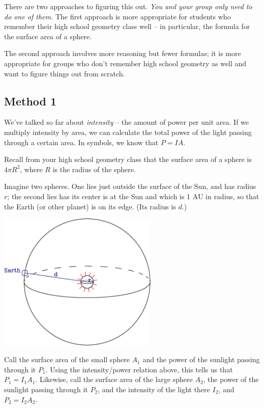 \documentclass[11pt]{article}
\begin{document}
There are two approaches to figuring this out. {\it You and your group only need to do one of them.} The first approach is more appropriate for students who remember their high school geometry class well -- in particular, the formula for the surface area of a sphere.

The second approach involves more reasoning but fewer formulas; it is more appropriate for groups who don't remember high school geometry as well and want to figure things out from scratch.
\newpage

\subsection*{Method 1}

We've talked so far about {\it intensity} -- the amount of power per unit area. If we multiply intensity by area, we can 
calculate the total power of the light passing through a certain area. In symbols, we know that $P=IA$.

Recall from your high school geometry class that the surface area of a sphere is $4\pi R^2$, where $R$ is the radius of 
the sphere.

Imagine two spheres. One lies just outside the surface of the Sun, and has radius $r$; the second lies
has its center is at the Sun and which is 1 AU in radius, so that the Earth (or other planet) 
is on its edge. (Its radius is $d$.) 

\begin{center}
\includegraphics[width=3in]{expand-crop.pdf}
\end{center}

Call the surface area of the small sphere $A_1$ and the power of the sunlight passing through it $P_1$. Using the intensity/power 
relation above, this tells us that $P_1=I_1 A_1$. Likewise, call the surface area of the large sphere $A_2$, the power of the 
sunlight passing through it $P_2$, and the intensity of the light there $I_2$, and $P_2 = I_2 A_2$.
\end{document}
